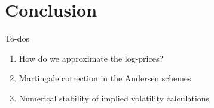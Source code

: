\documentclass[aspectratio=169]{beamer}
\begin{document}
    
    \section{Conclusion}
        \begin{frame}{To-dos}
            \begin{enumerate}
                \item How do we approximate the log-prices?
                \item Martingale correction in the Andersen schemes
                \item Numerical stability of implied volatility calculations
            \end{enumerate}
        \end{frame}
\end{document}
